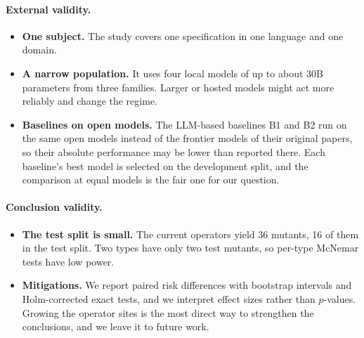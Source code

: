 \paragraph{External validity.}
\begin{itemize}[leftmargin=*]
\item \textbf{One subject.} The study covers one specification in one language and one domain.
\item \textbf{A narrow population.} It uses four local models of up to about 30B parameters from three families. Larger or hosted models might act more reliably and change the regime.
\item \textbf{Baselines on open models.} The LLM-based baselines B1 and B2 run on the same open models instead of the frontier models of their original papers, so their absolute performance may be lower than reported there. Each baseline's best model is selected on the development split, and the comparison at equal models is the fair one for our question.
\end{itemize}

\paragraph{Conclusion validity.}
\begin{itemize}[leftmargin=*]
\item \textbf{The test split is small.} The current operators yield 36 mutants, 16 of them in the test split. Two types have only two test mutants, so per-type McNemar tests have low power.
\item \textbf{Mitigations.} We report paired risk differences with bootstrap intervals and Holm-corrected exact tests, and we interpret effect sizes rather than $p$-values. Growing the operator sites is the most direct way to strengthen the conclusions, and we leave it to future work.
\end{itemize}
